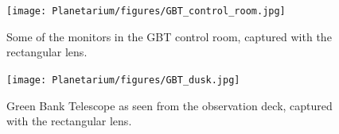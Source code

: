 \begin{figure}[htb]
\centering
\begin{minipage}[b]{0.51\textwidth}
\centering
\texttt{[image: Planetarium/figures/GBT\_control\_room.jpg]}
\caption{Some of the monitors in the GBT control room, captured with the rectangular lens. }
\label{Fig:GBT_control}
\end{minipage}%
\begin{minipage}[b]{0.02\textwidth}
\hspace{1cm}
\end{minipage}%
\begin{minipage}[b]{0.43\textwidth}
\centering
\texttt{[image: Planetarium/figures/GBT\_dusk.jpg]}
\caption{Green Bank Telescope as seen from the observation deck, captured with the rectangular lens.}
\label{Fig:GBT_dusk}
\end{minipage}
\end{figure}

